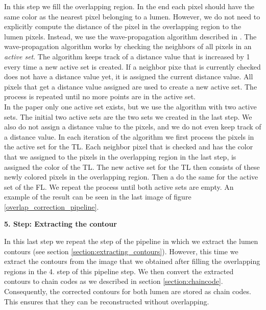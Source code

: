 \documentclass[thesis.tex]{subfiles}
\begin{document}
In this step we fill the overlapping region. In the end each pixel should have the same color as the nearest pixel belonging to a lumen. However, we do not need to explicitly compute the distance of the pixel in the overlapping region to the lumen pixels. Instead, we use the wave-propagation algorithm described in \cite{porikli2007fast}. The wave-propagation algorithm works by checking the neighbors of all pixels in an \textit{active set}. The algorithm keeps track of a distance value that is increased by 1 every time a new active set is created. If a neighbor pixe that is currently checked does not have a distance value yet, it is assigned the current distance value. All pixels that get a distance value assigned are used to create a new active set. The process is repeated until no more points are in the active set. \\
In the paper only one active set exists, but we use the algorithm with two active sets. The initial two active sets are the two sets we created in the last step. We also do not assign a distance value to the pixels, and we do not even keep track of a distance value. In each iteration of the algorithm we first process the pixels in the active set for the TL. Each neighbor pixel that is checked and has the color that we assigned to the pixels in the overlapping region in the last step, is assigned the color of the TL. The new active set for the TL then consists of these newly colored pixels in the overlapping region. Then a do the same for the active set of the FL. We repeat the process until both active sets are empty. An example of the result can be seen in the last image of figure \ref{overlap_correction_pipeline}.  

\textbf{5. Step: Extracting the contour}

In this last step we repeat the step of the pipeline in which we extract the lumen contours (see section \ref{section:extracting_contours}). However, this time we extract the contours from the image that we obtained after filling the overlapping regions in the 4. step of this pipeline step. We then convert the extracted contours to chain codes as we described in section \ref{section:chaincode}. Consequently, the corrected contours for both lumen are stored as chain codes. This ensures that they can be reconstructed without overlapping. 
\end{document}
